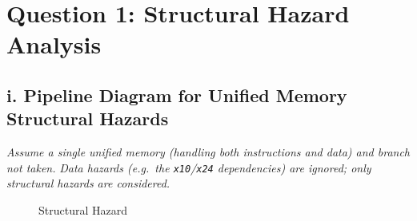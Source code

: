 \documentclass[11pt, a4paper]{article}
\begin{document}
\section*{\textcolor{accent}{Question 1: Structural Hazard Analysis}}

\subsection*{i. Pipeline Diagram for Unified Memory Structural Hazards}
\textit{Assume a single unified memory (handling both instructions and data) and branch not taken.}
\textit{Data hazards (e.g.\ the \texttt{x10}/\texttt{x24} dependencies) are ignored; only structural hazards are considered.}



\begin{figure}[htbp]
    \centering
    \resizebox{\textwidth}{!}{
    
    }    
    \caption{Structural Hazard}
    \label{fig:q1-pipeline-execution}
    
\end{figure}
\end{document}
